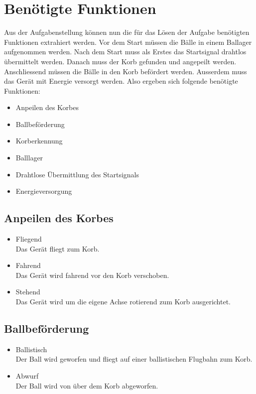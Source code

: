 \section{Benötigte Funktionen}
Aus der Aufgabenstellung können nun die für das Lösen der Aufgabe benötigten 
Funktionen extrahiert werden. Vor dem Start müssen die Bälle in einem Ballager 
aufgenommen werden. Nach dem Start muss als Erstes das Startsignal drahtlos 
übermittelt werden. Danach muss der Korb gefunden und angepeilt werden. 
Anschliessend müssen die Bälle in den Korb befördert werden. Ausserdem muss 
das Gerät mit Energie versorgt werden. Also ergeben sich folgende benötigte 
Funktionen: 
\begin{itemize}
    \item Anpeilen des Korbes
    \item Ballbeförderung
    \item Korberkennung
    \item Balllager
    \item Drahtlose Übermittlung des Startsignals
    \item Energieversorgung
\end{itemize}

\subsection{Anpeilen des Korbes}
\begin{itemize}
    \item Fliegend \\
        Das Gerät fliegt zum Korb. 
    \item Fahrend \\
        Das Gerät wird fahrend vor den Korb verschoben. 
    \item Stehend \\
        Das Gerät wird um die eigene Achse rotierend zum Korb ausgerichtet. 
\end{itemize}

\subsection{Ballbeförderung}
\begin{itemize}
    \item Ballistisch \\
        Der Ball wird geworfen und fliegt auf einer ballistischen Flugbahn zum 
        Korb. 
    \item Abwurf \\
        Der Ball wird von über dem Korb abgeworfen. 
\end{itemize}

